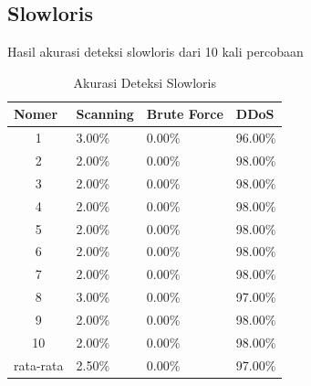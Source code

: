 \subsection{Slowloris}
Hasil akurasi deteksi slowloris dari 10 kali percobaan
\begin{table}[H]
	\centering
	\caption{Akurasi Deteksi Slowloris}
	\label{Akurasi Deteksi Slowloris}
	\begin{tabular}{|c|l|l|l|}
		\hline
		\multicolumn{1}{|l|}{Nomer}     & Scanning & Brute Force & DDoS    \\ \hline
		1                               & 3.00\%   & 0.00\%      & 96.00\% \\ \hline
		2                               & 2.00\%   & 0.00\%      & 98.00\% \\ \hline
		3                               & 2.00\%   & 0.00\%      & 98.00\% \\ \hline
		4                               & 2.00\%   & 0.00\%      & 98.00\% \\ \hline
		5                               & 2.00\%   & 0.00\%      & 98.00\% \\ \hline
		6                               & 2.00\%   & 0.00\%      & 98.00\% \\ \hline
		7                               & 2.00\%   & 0.00\%      & 98.00\% \\ \hline
		8                               & 3.00\%   & 0.00\%      & 97.00\% \\ \hline
		9                               & 2.00\%   & 0.00\%      & 98.00\% \\ \hline
		10                              & 2.00\%   & 0.00\%      & 98.00\% \\ \hline
		\multicolumn{1}{|l|}{rata-rata} & 2.50\%   & 0.00\%      & 97.00\% \\ \hline
	\end{tabular}
\end{table}


